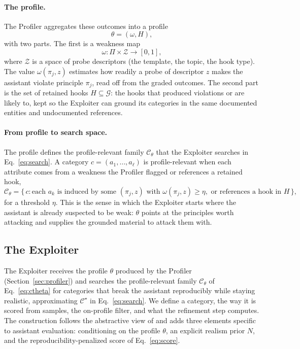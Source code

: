 \documentclass[11pt,a4paper]{article}
\begin{document}
\paragraph{The profile.}
The Profiler aggregates these outcomes into a profile
\begin{equation}
  \theta = (\omega, H),
  \label{eq:profile}
\end{equation}
with two parts. The first is a weakness map
\begin{equation}
  \omega : \Pi \times \mathcal{Z} \rightarrow [0,1],
  \label{eq:weakness}
\end{equation}
where $\mathcal{Z}$ is a space of probe descriptors (the template, the topic, the
hook type). The value $\omega(\pi_j, z)$ estimates how readily a probe of
descriptor $z$ makes the assistant violate principle $\pi_j$, read off from the
graded outcomes. The second part is the set of retained hooks
$H \subseteq \mathcal{G}$: the hooks that produced violations or are likely to,
kept so the Exploiter can ground its categories in the same documented entities
and undocumented references.

\paragraph{From profile to search space.}
The profile defines the profile-relevant family $\mathcal{C}_\theta$ that the
Exploiter searches in Eq.~\eqref{eq:search}. A category $c = (a_1, \dots, a_\ell)$
is profile-relevant when each attribute comes from a weakness the Profiler
flagged or references a retained hook,
\begin{equation}
  \mathcal{C}_\theta = \Big\{\, c :
  \text{each } a_k \text{ is induced by some } (\pi_j, z) \text{ with }
  \omega(\pi_j, z) \ge \eta, \text{ or references a hook in } H \,\Big\},
  \label{eq:ctheta}
\end{equation}
for a threshold $\eta$. This is the sense in which the Exploiter starts where the
assistant is already suspected to be weak: $\theta$ points at the principles
worth attacking and supplies the grounded material to attack them with.

\subsection{The Exploiter}
\label{sec:exploiter}

The Exploiter receives the profile $\theta$ produced by the Profiler
(Section~\ref{sec:profiler}) and searches the profile-relevant family
$\mathcal{C}_\theta$ of Eq.~\eqref{eq:ctheta} for categories that break the
assistant reproducibly while staying realistic, approximating $\mathcal{C}^\star$
in Eq.~\eqref{eq:search}. We define a category, the way it is scored from
samples, the on-profile filter, and what the refinement step computes. The
construction follows the abstractive view of \citet{rahn2026abstractive} and adds
three elements specific to assistant evaluation: conditioning on the profile
$\theta$, an explicit realism prior $N$, and the reproducibility-penalized score
of Eq.~\eqref{eq:score}.
\end{document}
